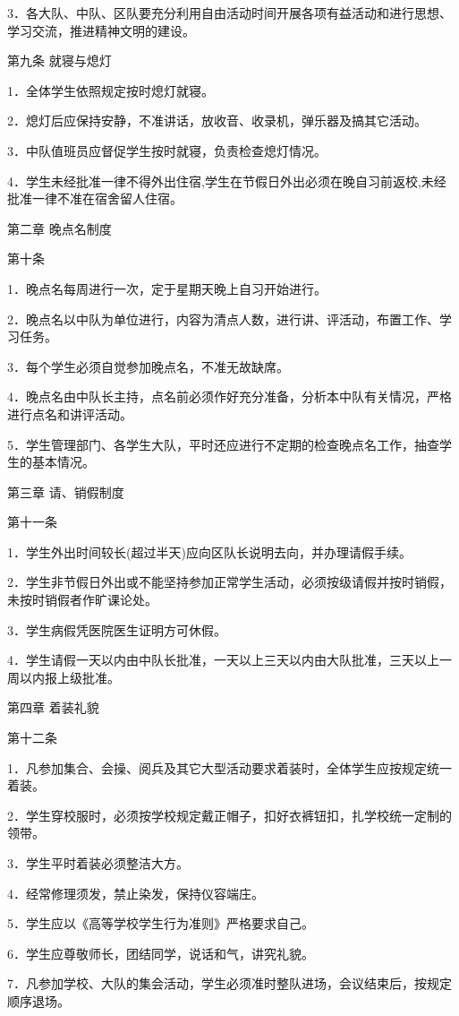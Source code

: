 \documentclass[UTF8,12pt,a4paper]{report}
\begin{document}
3．各大队、中队、区队要充分利用自由活动时间开展各项有益活动和进行思想、学习交流，推进精神文明的建设。

第九条 就寝与熄灯

1．全体学生依照规定按时熄灯就寝。

2．熄灯后应保持安静，不准讲话，放收音、收录机，弹乐器及搞其它活动。

3．中队值班员应督促学生按时就寝，负责检查熄灯情况。

4．学生未经批准一律不得外出住宿,学生在节假日外出必须在晚自习前返校,未经批准一律不准在宿舍留人住宿。

第二章 晚点名制度

第十条

1．晚点名每周进行一次，定于星期天晚上自习开始进行。

2．晚点名以中队为单位进行，内容为清点人数，进行讲、评活动，布置工作、学习任务。

3．每个学生必须自觉参加晚点名，不准无故缺席。

4．晚点名由中队长主持，点名前必须作好充分准备，分析本中队有关情况，严格进行点名和讲评活动。

5．学生管理部门、各学生大队，平时还应进行不定期的检查晚点名工作，抽查学生的基本情况。

第三章 请、销假制度

第十一条

1．学生外出时间较长(超过半天)应向区队长说明去向，并办理请假手续。

2．学生非节假日外出或不能坚持参加正常学生活动，必须按级请假并按时销假，未按时销假者作旷课论处。

3．学生病假凭医院医生证明方可休假。

4．学生请假一天以内由中队长批准，一天以上三天以内由大队批准，三天以上一周以内报上级批准。

第四章 着装礼貌

第十二条

1．凡参加集合、会操、阅兵及其它大型活动要求着装时，全体学生应按规定统一着装。

2．学生穿校服时，必须按学校规定戴正帽子，扣好衣裤钮扣，扎学校统一定制的领带。

3．学生平时着装必须整洁大方。

4．经常修理须发，禁止染发，保持仪容端庄。

5．学生应以《高等学校学生行为准则》严格要求自己。

6．学生应尊敬师长，团结同学，说话和气，讲究礼貌。

7．凡参加学校、大队的集会活动，学生必须准时整队进场，会议结束后，按规定顺序退场。
\end{document}
